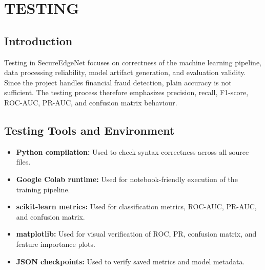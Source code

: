 \chapter{TESTING}
\section{Introduction}     
Testing in SecureEdgeNet focuses on correctness of the machine learning pipeline, data processing reliability, model artifact generation, and evaluation validity. Since the project handles financial fraud detection, plain accuracy is not sufficient. The testing process therefore emphasizes precision, recall, F1-score, ROC-AUC, PR-AUC, and confusion matrix behaviour.

\section{Testing Tools and Environment}	    
\begin{itemize}
    \item \textbf{Python compilation:} Used to check syntax correctness across all source files.
    \item \textbf{Google Colab runtime:} Used for notebook-friendly execution of the training pipeline.
    \item \textbf{scikit-learn metrics:} Used for classification metrics, ROC-AUC, PR-AUC, and confusion matrix.
    \item \textbf{matplotlib:} Used for visual verification of ROC, PR, confusion matrix, and feature importance plots.
    \item \textbf{JSON checkpoints:} Used to verify saved metrics and model metadata.
\end{itemize}

